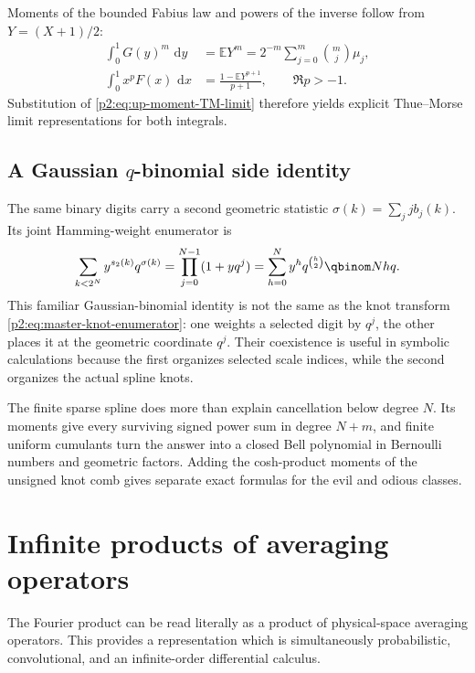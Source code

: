 \documentclass[11pt,oneside]{article}
\theoremstyle{definition}
\newcommand{\dd}{\,\mathrm d}
\newcommand{\E}{\mathbb E}
\begin{document}
Moments of the bounded Fabius law and powers of the inverse follow from
$Y=(X+1)/2$:
\begin{align}
 \int_0^1G(y)^m\,\dd y
 &=\E Y^m
 =2^{-m}\sum_{j=0}^m\binom mj\mu_j,                       \label{p2:eq:G-moment-up}\\
 \int_0^1x^pF(x)\,\dd x
 &=\frac{1-\E Y^{p+1}}{p+1},\qquad \Re p>-1.              \label{p2:eq:F-Mellin-moment}
\end{align}
Substitution of \eqref{p2:eq:up-moment-TM-limit} therefore yields explicit
Thue--Morse limit representations for both integrals.

\subsection{A Gaussian \texorpdfstring{$q$}{q}-binomial side identity}

The same binary digits carry a second geometric statistic
$\sigma(k)=\sum_jjb_j(k)$.  Its joint Hamming-weight enumerator is
\begin{equation}
 \sum_{k<2^N}y^{s_2(k)}q^{\sigma(k)}
 =\prod_{j=0}^{N-1}(1+yq^j)
 =\sum_{h=0}^{N}y^hq^{\binom h2}\qbinom Nhq.               \label{p2:eq:qbinomial-digit-enumerator}
\end{equation}
This familiar Gaussian-binomial identity is not the same as the knot transform
\eqref{p2:eq:master-knot-enumerator}: one weights a selected digit by $q^j$, the
other places it at the geometric coordinate $q^j$.  Their coexistence is useful
in symbolic calculations because the first organizes selected scale indices,
while the second organizes the actual spline knots.

\begin{resultbox}
The finite sparse spline does more than explain cancellation below degree $N$.
Its moments give every surviving signed power sum in degree $N+m$, and finite
uniform cumulants turn the answer into a closed Bell polynomial in Bernoulli
numbers and geometric factors.  Adding the cosh-product moments of the unsigned
knot comb gives separate exact formulas for the evil and odious classes.
\end{resultbox}

\section{Infinite products of averaging operators}
\label{p2:sec:operators}

The Fourier product can be read literally as a product of physical-space
averaging operators.  This provides a representation which is simultaneously
probabilistic, convolutional, and an infinite-order differential calculus.
\end{document}
